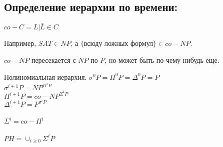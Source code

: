 \subsection{Определение иерархии по времени:} 
\begin{Def}
	$co-C = {L|\bar{L} \in C}$
\end{Def}

\begin{exmp}
	Например, $SAT \in NP$, а $\{$всюду ложных формул$\} \in co-NP$.\\
\end{exmp}

\begin{Rem}
	$co-NP$ пересекается с $NP$ по $P$, но может быть по чему-нибудь еще. 
\end{Rem}

\begin{Def}
	Полиномиальная иерархия. 
	$\sigma^0P = \Pi^0P = \Delta^0P = P$\\
	$\sigma^{i + 1}P = NP^{\Pi^iP}$\\
	$\Pi^{i + 1}P = co-NP^{\Sigma^iP}$\\
	$\Delta^{i + 1}P = P^{\sigma^iP}$\\
	\\
	$\Sigma^{i} = co-\Pi^{i}$\\
	\\
	$PH = \cup_{i \ge 0}\Sigma^{i}P$ \\
\end{Def}

